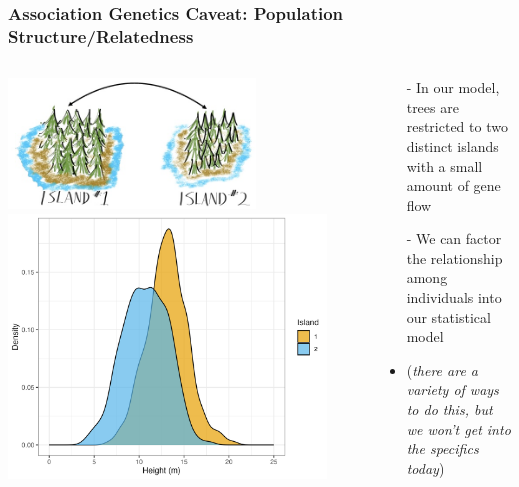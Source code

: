 \documentclass[xcolor=dvipsnames]{beamer}
\begin{document}
\begin{frame}
	
	\frametitle{Association Genetics Caveat: Population Structure/Relatedness}
	
		\begin{columns}
		\begin{column}{0.65\textwidth}
			
			\centering
			\includegraphics[keepaspectratio, width  = 0.7\textwidth]{img/treeIslands}
			\includegraphics[keepaspectratio, width  = 0.9\textwidth]{img/treePhens.png}				
			
			
		\end{column}
		\begin{column}{0.4\textwidth}
			\begin{itemize}
				\item[-] In our model, trees are restricted to two distinct islands with a small amount of gene flow
				\item[-] We can factor the relationship among individuals into our statistical model 
				\item \scriptsize (\textit{there are a variety of ways to do this, but we won't get into the specifics today}) 
			\end{itemize}
		\end{column}
	\end{columns}

\end{frame}
\end{document}
